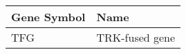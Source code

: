 \begin{tabular}{ll}
\toprule
Gene Symbol &           Name \\
\midrule
        TFG & TRK-fused gene \\
\bottomrule
\end{tabular}
